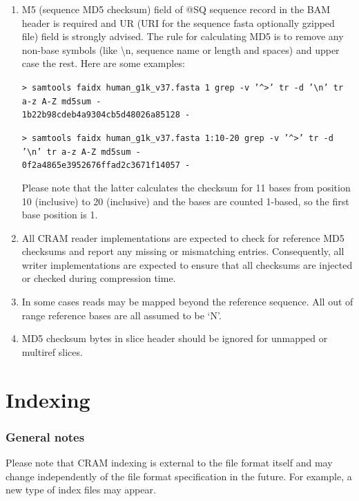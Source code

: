 \documentclass[a4paper]{article}
\begin{document}
\begin{enumerate}
\item M5 (sequence MD5 checksum) field of @SQ sequence record in the BAM header is 
required and UR (URI for the sequence fasta optionally gzipped file) field is strongly 
advised. The rule for calculating MD5 is to remove any non-base symbols (like \textbackslash{}n, 
sequence name or length and spaces) and upper case the rest. Here are some examples: 

\texttt{> samtools faidx human\_g1k\_v37.fasta 1 \textbar{} grep -v '\textasciicircum{}>' \textbar{} tr -d '\textbackslash{}n' \textbar{} tr a-z A-Z \textbar{} md5sum -\\
1b22b98cdeb4a9304cb5d48026a85128  -}

\texttt{> samtools faidx human\_g1k\_v37.fasta 1:10-20 \textbar{}grep -v '\textasciicircum{}\texttt{>}' \textbar{}tr -d '\textbackslash{}n' \textbar{}tr a-z A-Z \textbar{}md5sum -\\
0f2a4865e3952676ffad2c3671f14057  -}

Please note that the latter calculates the checksum for 11 bases from position 
10 (inclusive) to 20 (inclusive) and the bases are counted 1-based, so the first 
base position is 1. 

\item All CRAM reader implementations are expected to check for reference MD5 checksums 
and report any missing or mismatching entries. Consequently, all writer implementations 
are expected to ensure that all checksums are injected or checked during compression 
time. 

\item In some cases reads may be mapped beyond the reference sequence. All out of 
range reference bases are all assumed to be `N'. 

\item MD5 checksum bytes in slice header should be ignored for unmapped or multiref 
slices. 
\end{enumerate}

\section{\textbf{Indexing}}

\subsubsection*{General notes}

Please note that CRAM indexing is external to the file format itself and may change 
independently of the file format specification in the future. For example, a new 
type of index files may appear. 
\end{document}
